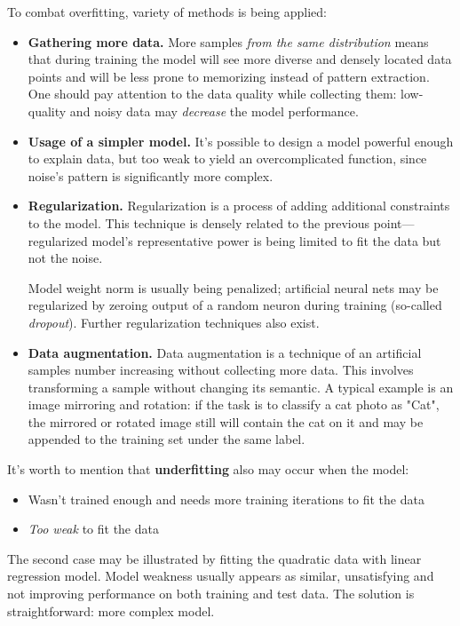\documentclass[thesis=B,english]{FITthesis}[2019/12/23]
\begin{document}
To combat overfitting, variety of methods is being applied:
\begin{itemize}
	\item \textbf{Gathering more data.} More samples \textit{from the same distribution} means that during training the model will see more diverse and densely located data points and will be less prone to memorizing instead of pattern extraction. One should pay attention to the data quality while collecting them: low-quality and noisy data may \textit{decrease} the model performance.
	\item \textbf{Usage of a simpler model.} It's possible to design a model powerful enough to explain data, but too weak to yield an overcomplicated function, since noise's pattern is significantly more complex.
	\item \textbf{Regularization.} Regularization is a process of adding additional constraints to the model. This technique is densely related to the previous point---regularized model's representative power is being limited to fit the data but not the noise.
	
	Model weight norm is usually being penalized; artificial neural nets may be regularized by zeroing output of a random neuron during training (so-called \textit{dropout}). Further regularization techniques also exist.
	\item \textbf{Data augmentation.} Data augmentation is a technique of an artificial samples number increasing without collecting more data. This involves transforming a sample without changing its semantic. A typical example is an image mirroring and rotation: if the task is to classify a cat photo as "Cat", the mirrored or rotated image still will contain the cat on it and may be appended to the training set under the same label.
\end{itemize}

It's worth to mention that \textbf{underfitting} also may occur when the model:
\begin{itemize}
	\item Wasn't trained enough and needs more training iterations to fit the data
	\item \textit{Too weak} to fit the data
\end{itemize}

The second case may be illustrated by fitting the quadratic data with linear regression model. Model weakness usually appears as similar, unsatisfying and not improving performance on both training and test data. The solution is straightforward: more complex model.
\end{document}
